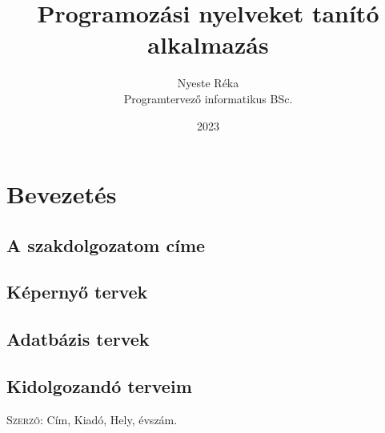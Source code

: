 \documentclass{thesis-ekf}
\begin{document}
	\title{Programozási nyelveket tanító alkalmazás}
	\author{Nyeste Réka\\Programtervező informatikus BSc.}
	\date{2023}
	\maketitle
	\tableofcontents
	\chapter{Bevezetés}
	\section{A szakdolgozatom címe}
	
	\section{Képernyő tervek}
	\section{Adatbázis tervek}
	\section{Kidolgozandó terveim}
	\begin{thebibliography}{1}
		 \textsc{Szerző}: Cím, Kiadó, Hely, évszám.
	\end{thebibliography}
\end{document}
